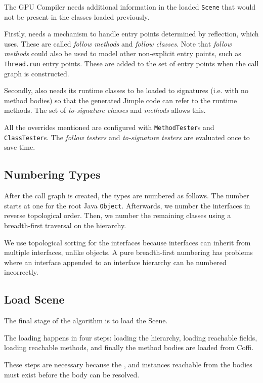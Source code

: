 \documentclass{sigplanconf}
\begin{document}
The \rb GPU Compiler needs additional information in the loaded {\tt Scene} that would not be present in the classes loaded previously.

Firstly, \rb needs a mechanism to handle entry points determined by reflection, which \rb uses. These are called \emph{follow methods} and \emph{follow classes}. Note that \emph{follow methods} could also be used to model other non-explicit entry points, such as {\tt Thread.run} entry points. These are added to the set of entry points when the call graph is constructed.

Secondly, \rb also needs its runtime classes to be loaded to signatures (i.e. with no method bodies) so that the generated Jimple code can refer to the runtime methods. The set of \emph{to-signature classes} and \emph{methods} allows this.

All the overrides mentioned are configured with {\tt MethodTester}s and {\tt ClassTester}s. The \emph{follow testers} and \emph{to-signature testers} are evaluated once to save time.

\subsection{Numbering Types}
\label{sec:numbering}

After the call graph is created, the types are numbered as follows. The number starts at one for the root Java {\tt Object}. Afterwards, we number the interfaces in reverse topological order. Then, we number the remaining classes using a breadth-first traversal on the hierarchy.

We use topological sorting for the interfaces because interfaces can inherit from multiple interfaces, unlike objects. A pure breadth-first numbering has problems where an interface appended to an interface hierarchy can be numbered incorrectly.

\subsection{Load Scene}
\label{sec:loadscene}
The final stage of the algorithm is to load the Scene. 

The loading happens in four steps: loading the hierarchy, loading reachable fields, loading reachable methods, and finally the method bodies are loaded from Coffi.

These steps are necessary because the \sootclass, \sootfield and \sootmethod instances reachable from the bodies must exist before the body can be resolved.
\end{document}

